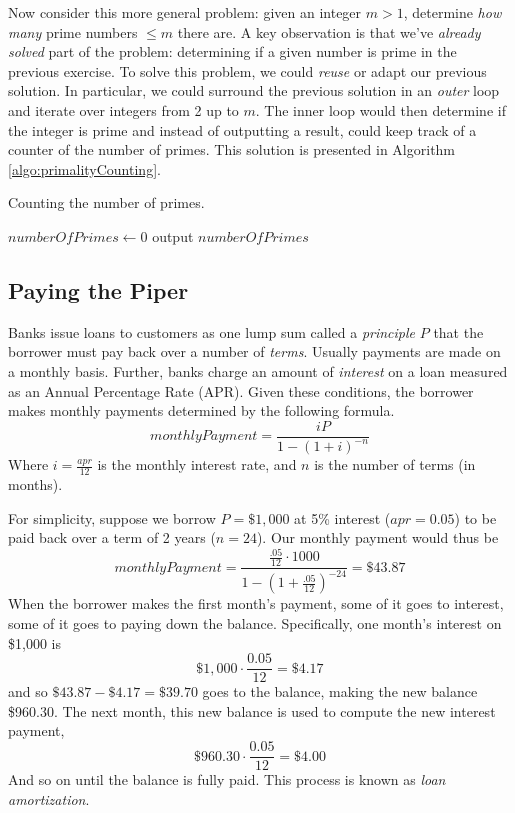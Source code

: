 Now consider this more general problem: given an integer $m > 1$, determine
\emph{how many} prime numbers $\leq m$ there are.  A key observation is that 
we've \emph{already solved} part of the problem: determining if a given number
is prime in the previous exercise.  To solve this problem, we could \emph{reuse}
or adapt our previous solution.  In particular, we could surround the previous
solution in an \emph{outer} loop and iterate over integers from 2 up to $m$.  
The inner loop would then determine if the integer is prime and instead of 
outputting a result, could keep track of a counter of the number of primes.
This solution is presented in Algorithm \ref{algo:primalityCounting}.

\begin{algorithm}[H]
\caption{Counting the number of primes.}
\label{algo:primalityCounting}
$numberOfPrimes \leftarrow 0$ \;
output $numberOfPrimes$ \;
\end{algorithm}

\subsection{Paying the Piper}
\label{subsection:loanAmortization}

Banks issue loans to customers as one lump sum called a \emph{principle} $P$ that
the borrower must pay back over a number of \emph{terms}.  Usually payments
are made on a monthly basis.  Further, banks charge an amount of \emph{interest} on a
loan measured as an Annual Percentage Rate (APR).  Given these conditions, 
the borrower makes monthly payments determined by the following formula.
$$ {monthlyPayment} = \frac{iP}{1 - (1 + i)^{-n}} $$
Where $i = \frac{apr}{12}$ is the monthly interest rate, and $n$ is the number of terms
(in months).

For simplicity, suppose we borrow $P = \$1,000$ at 5\% interest ($apr = 0.05$) to 
be paid back over a term of 2 years ($n = 24$).  Our monthly payment would thus
be 
  $$ {monthlyPayment} = \frac{\frac{.05}{12}\cdot 1000}{1 - (1 + \frac{.05}{12})^{-24}} = \$43.87$$
When the borrower makes the first month's payment, some of it goes to interest, 
some of it goes to paying down the balance.  Specifically, one month's interest on \$1,000 is
  $$\$1,000 \cdot \frac{0.05}{12} = \$4.17$$
and so $\$43.87 - \$4.17 = \$39.70$ goes to the balance, making the new balance
\$960.30.  The next month, this new balance is used to compute the new interest payment, 
  $$\$960.30 \cdot \frac{0.05}{12} = \$4.00$$
And so on until the balance is fully paid.  This process is known as \emph{loan amortization}.

